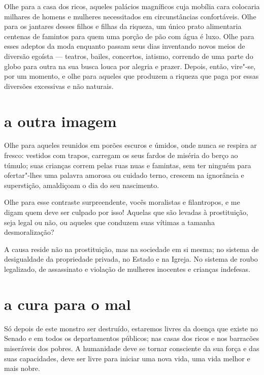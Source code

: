 Olhe para a casa dos ricos, aqueles palácios magníficos cuja mobília
cara colocaria milhares de homens e mulheres necessitados em
circunstâncias confortáveis. Olhe para os jantares desses filhos e
filhas da riqueza, um único prato alimentaria centenas de famintos para
quem uma porção de pão com água é luxo. Olhe para esses adeptos da moda
enquanto passam seus dias inventando novos meios de diversão egoísta --- teatros, bailes, concertos, iatismo, correndo de uma parte do globo para
outra na sua busca louca por alegria e prazer. Depois, então, vire"-se,
por um momento, e olhe para aqueles que produzem a riqueza que paga por
essas diversões excessivas e não naturais.

\section{a outra imagem}

Olhe para aqueles reunidos em porões escuros e úmidos, onde nunca se respira
ar fresco: vestidos com trapos, carregam os seus fardos de miséria do
berço ao túmulo; suas crianças correm pelas ruas nuas e famintas, sem ter ninguém para ofertar"-lhes uma palavra amorosa ou cuidado terno, crescem na ignorância e superstição, amaldiçoam o dia do seu nascimento.

Olhe para esse contraste surpreendente, vocês moralistas e filantropos,
e me digam quem deve ser culpado por isso! Aquelas que são levadas à
prostituição, seja legal ou não, ou aqueles que conduzem suas vítimas a
tamanha desmoralização?

A causa reside não na prostituição, mas na sociedade em si mesma; no
sistema de desigualdade da propriedade privada, no Estado e na Igreja. No
sistema de roubo legalizado, de assassinato e violação de mulheres
inocentes e crianças indefesas.

\section{a cura para o mal}

Só depois de este monstro ser destruído, estaremos livres da doença que
existe no Senado e em todos os departamentos públicos; nas casas dos
ricos e nos barracões miseráveis dos pobres. A humanidade deve
se tornar consciente da sua força e das suas capacidades, deve ser livre
para iniciar uma nova vida, uma vida melhor e mais nobre.

